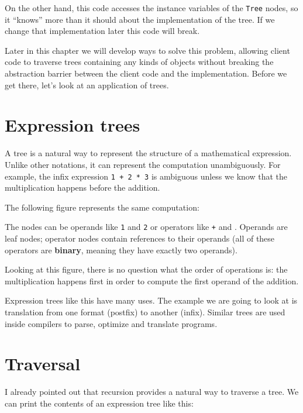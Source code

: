 On the other hand, this code accesses the instance variables
of the {\tt Tree} nodes, so it ``knows'' more than it should about
the implementation of the tree.  If we change that implementation
later this code will break.

Later in this chapter we will develop ways to solve this problem,
allowing client code to traverse trees containing any kinds of objects
without breaking the abstraction barrier between the client code and
the implementation.  Before we get there, let's look at an
application of trees.


\section {Expression trees}

A tree is a natural way to represent the structure of a
mathematical expression.
Unlike other notations, it can represent the computation unambiguously.
For example, the infix expression {\tt 1 + 2 * 3} is ambiguous unless
we know that the multiplication happens before the addition.

The following figure represents the same computation:


The nodes can be operands like {\tt 1} and {\tt 2} or operators
like {\tt +} and {\tt *}.  Operands are leaf nodes; operator nodes 
contain references to their operands (all of these operators
are {\bf binary}, meaning they have exactly two operands).

Looking at this figure, there is no question what the order of
operations is: the multiplication happens first in order to compute
the first operand of the addition.

Expression trees like this have many uses.  The example we are
going to look at is translation from one format (postfix) to
another (infix).  Similar trees are used inside compilers to parse,
optimize and translate programs.


\section {Traversal}

I already pointed out that recursion provides a natural way to
traverse a tree.  We can print the contents of an expression tree
like this:

